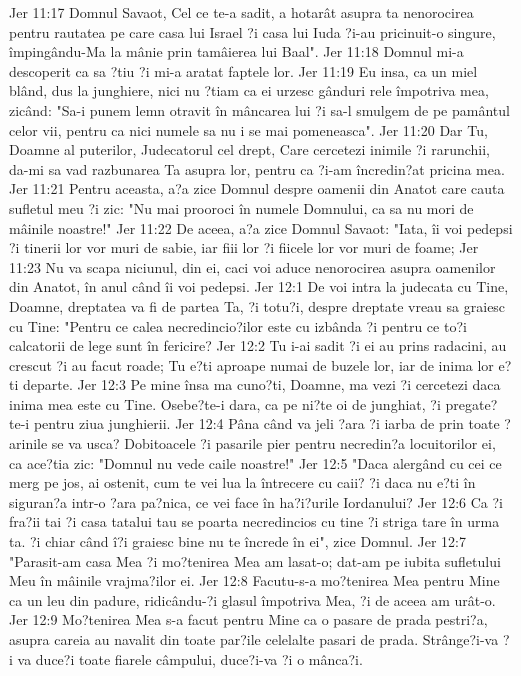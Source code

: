 Jer 11:17  Domnul Savaot, Cel ce te-a sadit, a hotarât asupra ta nenorocirea pentru rautatea pe care casa lui Israel ?i casa lui Iuda ?i-au pricinuit-o singure, împingându-Ma la mânie prin tamâierea lui Baal".
Jer 11:18  Domnul mi-a descoperit ca sa ?tiu ?i mi-a aratat faptele lor.
Jer 11:19  Eu insa, ca un miel blând, dus la junghiere, nici nu ?tiam ca ei urzesc gânduri rele împotriva mea, zicând: "Sa-i punem lemn otravit în mâncarea lui ?i sa-l smulgem de pe pamântul celor vii, pentru ca nici numele sa nu i se mai pomeneasca".
Jer 11:20  Dar Tu, Doamne al puterilor, Judecatorul cel drept, Care cercetezi inimile ?i rarunchii, da-mi sa vad razbunarea Ta asupra lor, pentru ca ?i-am încredin?at pricina mea.
Jer 11:21  Pentru aceasta, a?a zice Domnul despre oamenii din Anatot care cauta sufletul meu ?i zic: "Nu mai prooroci în numele Domnului, ca sa nu mori de mâinile noastre!"
Jer 11:22  De aceea, a?a zice Domnul Savaot: "Iata, îi voi pedepsi ?i tinerii lor vor muri de sabie, iar fiii lor ?i fiicele lor vor muri de foame;
Jer 11:23  Nu va scapa niciunul, din ei, caci voi aduce nenorocirea asupra oamenilor din Anatot, în anul când îi voi pedepsi.
Jer 12:1  De voi intra la judecata cu Tine, Doamne, dreptatea va fi de partea Ta, ?i totu?i, despre dreptate vreau sa graiesc cu Tine: "Pentru ce calea necredincio?ilor este cu izbânda ?i pentru ce to?i calcatorii de lege sunt în fericire?
Jer 12:2  Tu i-ai sadit ?i ei au prins radacini, au crescut ?i au facut roade; Tu e?ti aproape numai de buzele lor, iar de inima lor e?ti departe.
Jer 12:3  Pe mine însa ma cuno?ti, Doamne, ma vezi ?i cercetezi daca inima mea este cu Tine. Osebe?te-i dara, ca pe ni?te oi de junghiat, ?i pregate?te-i pentru ziua junghierii.
Jer 12:4  Pâna când va jeli ?ara ?i iarba de prin toate ?arinile se va usca? Dobitoacele ?i pasarile pier pentru necredin?a locuitorilor ei, ca ace?tia zic: "Domnul nu vede caile noastre!"
Jer 12:5  "Daca alergând cu cei ce merg pe jos, ai ostenit, cum te vei lua la întrecere cu caii? ?i daca nu e?ti în siguran?a intr-o ?ara pa?nica, ce vei face în ha?i?urile Iordanului?
Jer 12:6  Ca ?i fra?ii tai ?i casa tatalui tau se poarta necredincios cu tine ?i striga tare în urma ta. ?i chiar când î?i graiesc bine nu te încrede în ei", zice Domnul.
Jer 12:7  "Parasit-am casa Mea ?i mo?tenirea Mea am lasat-o; dat-am pe iubita sufletului Meu în mâinile vrajma?ilor ei.
Jer 12:8  Facutu-s-a mo?tenirea Mea pentru Mine ca un leu din padure, ridicându-?i glasul împotriva Mea, ?i de aceea am urât-o.
Jer 12:9  Mo?tenirea Mea s-a facut pentru Mine ca o pasare de prada pestri?a, asupra careia au navalit din toate par?ile celelalte pasari de prada. Strânge?i-va ?i va duce?i toate fiarele câmpului, duce?i-va ?i o mânca?i.
